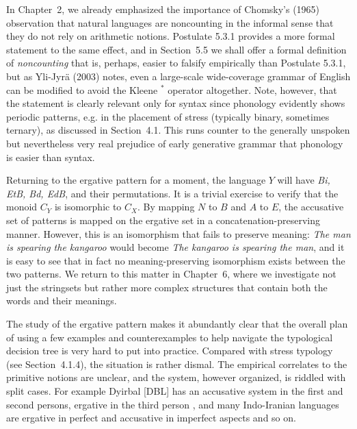 \smallskip
\noindent
In Chapter~2, we already emphasized the importance of Chomsky's (1965)
observation that natural languages are noncounting in the informal sense that
they do not rely on arithmetic notions. Postulate 5.3.1 provides a more formal
statement to the same effect, and in Section~5.5 we shall offer a formal
definition of {\it noncounting} that is, perhaps, easier to falsify
empirically than Postulate 5.3.1, but as Yli-Jyr\"{a}
(2003)\nocite{Yli-Jyra2:2003} notes, even a large-scale wide-coverage grammar
of English \cite{Voutilainen:1994} can be modified to avoid the Kleene $^*$
operator altogether.  Note, however, that the statement is clearly relevant
only for syntax since phonology evidently shows periodic patterns, e.g.  in
the placement of stress (typically binary, sometimes ternary), as discussed in
Section~4.1.  This runs counter to the generally unspoken but nevertheless
very real prejudice of early generative grammar that phonology is easier than
syntax.

Returning to the ergative pattern for a moment, the language $Y$ will have
{\it Bi, EtB, Bd, EdB}, and their permutations. It is a trivial exercise to
verify that the monoid $C_Y$ is isomorphic to $C_X$. By mapping $N$ to $B$ and
$A$ to $E$, the accusative set of patterns is mapped on the ergative set in a
concatenation-preserving manner. However, this is an isomorphism that fails to
preserve meaning: {\it The man is spearing the kangaroo} would become {\it The
  kangaroo is spearing the man}, and it is easy to see that in fact no
meaning-preserving isomorphism exists between the two patterns. We return to
this matter in Chapter~6, where we investigate not just the stringsets but
rather more complex structures that contain both the words and their meanings.

The study of the ergative pattern makes it abundantly clear that the overall
plan of using a few examples and counterexamples to help navigate the
typological decision tree is very hard to put into practice.  Compared with
stress typology (see Section~4.1.4), the situation is rather dismal. The
empirical correlates to the primitive notions are unclear, and the system,
however organized, is riddled with split cases. For example Dyirbal [DBL] has
an accusative system in the first and second persons, ergative in the third
person \cite{Schmidt:1985}, and many Indo-Iranian languages are ergative in
perfect and accusative in imperfect aspects and so on.

